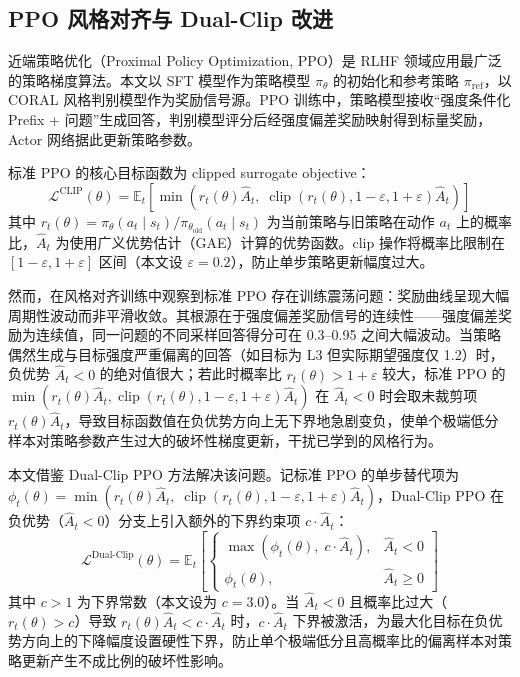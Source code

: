 \documentclass[fontset=fandol,type=master,campus=shenzhen,etitleauto=true]{hithesisbook}
\begin{document}
\subsection{PPO 风格对齐与 Dual-Clip 改进}\label{ppo-ux98ceux683cux5bf9ux9f50ux4e0e-dual-clip-ux6539ux8fdb}

近端策略优化（Proximal Policy Optimization, PPO）是 RLHF 领域应用最广泛的策略梯度算法。本文以 SFT 模型作为策略模型 $\pi_\theta$ 的初始化和参考策略 $\pi_{\text{ref}}$，以 CORAL 风格判别模型作为奖励信号源。PPO 训练中，策略模型接收``强度条件化 Prefix + 问题''生成回答，判别模型评分后经强度偏差奖励映射得到标量奖励，Actor 网络据此更新策略参数。

标准 PPO 的核心目标函数为 clipped surrogate objective：
\begin{equation}
\mathcal{L}^{\text{CLIP}}(\theta) = \mathbb{E}_t \left[ \min\left( r_t(\theta) \hat{A}_t,\; \operatorname{clip}(r_t(\theta), 1-\varepsilon, 1+\varepsilon) \hat{A}_t \right) \right]
\end{equation}
其中 $r_t(\theta) = \pi_\theta(a_t \mid s_t) / \pi_{\theta_{\text{old}}}(a_t \mid s_t)$ 为当前策略与旧策略在动作 $a_t$ 上的概率比，$\hat{A}_t$ 为使用广义优势估计（GAE）计算的优势函数。clip 操作将概率比限制在 $[1-\varepsilon, 1+\varepsilon]$ 区间（本文设 $\varepsilon = 0.2$），防止单步策略更新幅度过大。

然而，在风格对齐训练中观察到标准 PPO 存在训练震荡问题：奖励曲线呈现大幅周期性波动而非平滑收敛。其根源在于强度偏差奖励信号的连续性------强度偏差奖励为连续值，同一问题的不同采样回答得分可在 0.3--0.95 之间大幅波动。当策略偶然生成与目标强度严重偏离的回答（如目标为 L3 但实际期望强度仅 1.2）时，负优势 $\hat{A}_t < 0$ 的绝对值很大；若此时概率比 $r_t(\theta) > 1+\varepsilon$ 较大，标准 PPO 的 $\min\left(r_t(\theta)\hat{A}_t, \operatorname{clip}(r_t(\theta), 1-\varepsilon, 1+\varepsilon)\hat{A}_t\right)$ 在 $\hat{A}_t < 0$ 时会取未裁剪项 $r_t(\theta)\hat{A}_t$，导致目标函数值在负优势方向上无下界地急剧变负，使单个极端低分样本对策略参数产生过大的破坏性梯度更新，干扰已学到的风格行为。

本文借鉴 Dual-Clip PPO 方法\cite{ref81}解决该问题。记标准 PPO 的单步替代项为 $\phi_t(\theta) = \min\left(r_t(\theta)\hat{A}_t,\; \operatorname{clip}(r_t(\theta), 1-\varepsilon, 1+\varepsilon)\hat{A}_t\right)$，Dual-Clip PPO 在负优势（$\hat{A}_t < 0$）分支上引入额外的下界约束项 $c \cdot \hat{A}_t$：
\begin{equation}
\mathcal{L}^{\text{Dual-Clip}}(\theta) = \mathbb{E}_t \left[
\begin{cases}
\max\left( \phi_t(\theta),\; c \cdot \hat{A}_t \right), & \hat{A}_t < 0 \\
\phi_t(\theta), & \hat{A}_t \ge 0
\end{cases}
\right]
\end{equation}
其中 $c > 1$ 为下界常数（本文设为 $c = 3.0$）。当 $\hat{A}_t < 0$ 且概率比过大（$r_t(\theta) > c$）导致 $r_t(\theta)\hat{A}_t < c \cdot \hat{A}_t$ 时，$c \cdot \hat{A}_t$ 下界被激活，为最大化目标在负优势方向上的下降幅度设置硬性下界，防止单个极端低分且高概率比的偏离样本对策略更新产生不成比例的破坏性影响。
\end{document}
